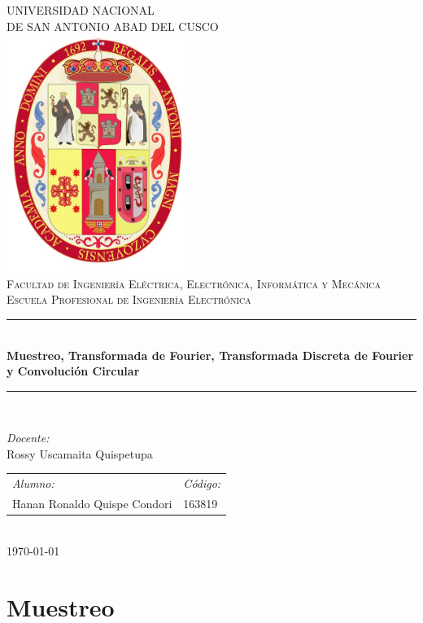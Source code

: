 \documentclass[12pt]{article}
\date{\today}
\begin{document}
\begin{titlepage}
\newcommand{\HRule}{\rule{\linewidth}{0.5mm}} 
\center
\textsc{\LARGE  UNIVERSIDAD NACIONAL \\[0.2cm] DE SAN ANTONIO ABAD DEL CUSCO}\\[1.5cm] 
\includegraphics[width=6cm]{IMAGENES/escudo}\\[1cm]
\textsc{\Large Facultad de Ingeniería Eléctrica, Electrónica, Informática y Mecánica}\\[0.5cm] 
\textsc{\large Escuela Profesional de Ingeniería Electrónica}\\[0.5cm]
\HRule \\[0.4cm]
{ \huge \bfseries Muestreo, Transformada de Fourier, Transformada Discreta de Fourier y Convolución Circular}\\[0.4cm] 
\HRule \\[1.5cm]
\begin{minipage}{\textwidth}
\center 

\emph{Docente:} \\
Rossy Uscamaita Quispetupa \\[1cm]

\begin{tabular}{ll}
\emph{Alumno:} & \emph{Código:}\\
Hanan Ronaldo Quispe Condori  & 163819 \\
\end{tabular}
\end{minipage}\\[2cm]
\today
\end{titlepage}

\newpage
\section{Muestreo}
\end{document}
